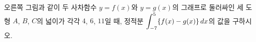 \noindent\begin{minipage}[t]{0.58\linewidth}\vspace{0pt}\raggedright 오른쪽 그림과 같이 두 사차함수 $y=f(x)$와 $y=g(x)$의 그래프로 둘러싸인 세 도형 $A$, $B$, $C$의 넓이가 각각 $4$, $6$, $11$일 때, 정적분 $\displaystyle\int_{-7}^{5}\{f(x)-g(x)\}\mkern3mu dx$의 값을 구하시오.\end{minipage}\hfill\begin{minipage}[t]{0.4\linewidth}\vspace{0pt}\centering \resizebox{\ifdim\width>\linewidth\linewidth\else\width\fi}{!}{}\end{minipage}\par
